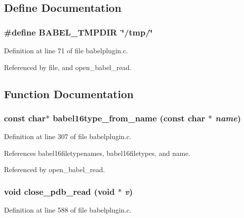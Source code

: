 \subsection{Define Documentation}
\subsubsection{\setlength{\rightskip}{0pt plus 5cm}\#define BABEL\_\-TMPDIR\ \char`\"{}/tmp/\char`\"{}}\label{babelplugin_8c_a0}




Definition at line 71 of file babelplugin.c.

Referenced by file, and open\_\-babel\_\-read.

\subsection{Function Documentation}
\subsubsection{\setlength{\rightskip}{0pt plus 5cm}const char$\ast$ babel16type\_\-from\_\-name (const char $\ast$ {\em name})\hspace{0.3cm}{\tt  [static]}}\label{babelplugin_8c_a12}




Definition at line 307 of file babelplugin.c.

References babel16filetypenames, babel16filetypes, and name.

Referenced by open\_\-babel\_\-read.
\subsubsection{\setlength{\rightskip}{0pt plus 5cm}void close\_\-pdb\_\-read (void $\ast$ {\em v})\hspace{0.3cm}{\tt  [static]}}\label{babelplugin_8c_a17}




Definition at line 588 of file babelplugin.c.

